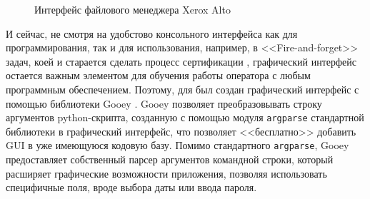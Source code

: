 \begin{figure}[!htbp]
    \caption{Интерфейс файлового менеджера Xerox Alto \label{fig:xerox-alto-gui}}
\end{figure}

И сейчас, не смотря на удобстово консольного интерфейса как для программирования, так и для использования,
например, в <<Fire-and-forget>> задач, коей и старается сделать процесс сертификации {\ProgModule},
графический интерфейс остается важным элементом для обучения работы оператора с любым
программным обеспечением. Поэтому, для {\ProgModule} был создан графический интерфейс с помощью
библиотеки Gooey \autocite{gooey}.
Gooey позволяет преобразовывать строку аргументов python-скрипта, созданную с помощью
модуля \verb|argparse| стандартной библиотеки в графический интерфейс, что позволяет
<<бесплатно>> добавить GUI в уже имеющуюся кодовую базу.
Помимо стандартного \verb|argparse|, Gooey предоставляет собственный парсер аргументов
командной строки, который расширяет графические возможности приложения, позволяя
использовать специфичные поля, вроде выбора даты или ввода пароля.

